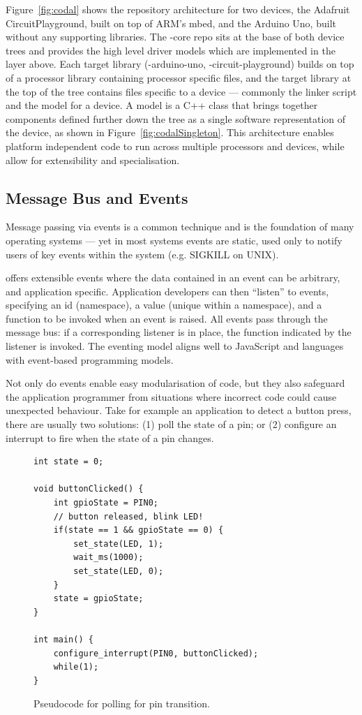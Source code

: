 Figure~\ref{fig:codal} shows the repository architecture for two \CO devices, the Adafruit CircuitPlayground, built on top of ARM's mbed, and the Arduino Uno, built without any supporting libraries. The \COLN-core repo sits at the base of both device trees and provides the high level driver models which are implemented in the layer above. Each target library (\COLN-arduino-uno, \COLN-circuit-playground) builds on top of a processor library containing processor specific files, and the target library at the top of the tree contains files specific to a device --- commonly the linker script and the model for a device. A model is a C++ class that brings together components defined further down the tree as a single software representation of the device,
as shown in Figure~\ref{fig:codalSingleton}.
This architecture enables platform independent code to run across multiple processors and devices, while allow for extensibility and specialisation.

\subsection{Message Bus and Events}

Message passing via events is a common technique and is the foundation of many operating systems --- yet in most systems events are static, used only to notify users of key events within the system (e.g. SIGKILL on UNIX).


\CO offers extensible events where the data contained in an event can be arbitrary, and application specific. Application developers can then ``listen'' to events, specifying an id (namespace), a value (unique within a namespace), and a function to be invoked when an event is raised. All events pass through the message bus: if a corresponding listener is in place, the function indicated by the listener is invoked. The eventing model aligns well to JavaScript and languages with event-based programming models.

Not only do events enable easy modularisation of code, but they also safeguard the application programmer from situations where incorrect code could cause unexpected behaviour. Take for example an application to detect a button press, there are usually two solutions: (1) poll the state of a pin; or (2) configure an interrupt to fire when the state of a pin changes.

\begin{figure}
\begin{lstlisting}
int state = 0;

void buttonClicked() {
    int gpioState = PIN0;
    // button released, blink LED!
    if(state == 1 && gpioState == 0) {
        set_state(LED, 1);
        wait_ms(1000);
        set_state(LED, 0);
    }
    state = gpioState;
}

int main() {
    configure_interrupt(PIN0, buttonClicked);
    while(1);
}
\end{lstlisting}
\caption{\label{fig:pollPin}Pseudocode for polling for pin transition.}
\end{figure}

